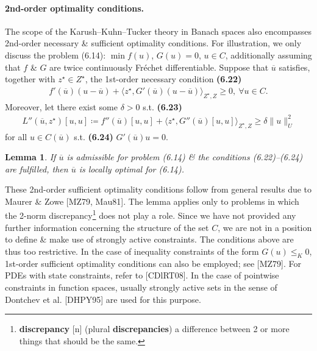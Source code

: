 \documentclass[oneside]{book}
\numberwithin{equation}{section}
\newtheorem{lemma}{Lemma}[chapter]
\begin{document}
\paragraph{2nd-order optimality conditions.} The scope of the Karush--Kuhn--Tucker theory in Banach spaces also encompasses 2nd-order necessary \& sufficient optimality conditions. For illustration, we only discuss the problem (6.14): $\min f(u)$, $G(u) = 0$, $u\in C$, additionally assuming that $f$ \& $G$ are twice continuously Fr\'echet differentiable. Suppose that $\overline{u}$ satisfies, together with $z^\star\in Z^\star$, the 1st-order necessary condition \textbf{(6.22)}
\begin{align*}
	f'(\overline{u})(u - \overline{u}) + \langle z^\star,G'(\overline{u})(u - \overline{u})\rangle_{Z^\star,Z}\ge 0,\ \forall u\in C.
\end{align*}
Moreover, let there exist some $\delta > 0$ s.t. \textbf{(6.23)}
\begin{align*}
	L''(\overline{u},z^\star)[u,u]\coloneqq f''(\overline{u})[u,u] + \langle z^\star,G''(\overline{u})[u,u]\rangle_{Z^\star,Z}\ge\delta\|u\|_U^2
\end{align*}
for all $u\in C(\overline{u})$ s.t. \textbf{(6.24)} $G'(\overline{u})u = 0$.

\begin{lemma}
	If $\overline{u}$ is admissible for problem (6.14) \& the conditions (6.22)--(6.24) are fulfilled, then $\overline{u}$ is locally optimal for (6.14).
\end{lemma}
These 2nd-order sufficient optimality conditions follow from general results due to Maurer \& Zowe [MZ79, Mau81]. The lemma applies only to problems in which the 2-norm discrepancy\footnote{\textbf{discrepancy} [n] (plural \textbf{discrepancies}) a difference between 2 or more things that should be the same.} does not play a role. Since we have not provided any further information concerning the structure of the set $C$, we are not in a position to define \& make use of strongly active constraints. The conditions above are thus too restrictive. In the case of inequality constraints of the form $G(u)\le_K 0$, 1st-order sufficient optimality conditions can also be employed; see [MZ79]. For PDEs with state constraints, refer to [CDlRT08]. In the case of pointwise constraints in function spaces, usually strongly active sets in the sense of Dontchev et al. [DHPY95] are used for this purpose.
\end{document}
